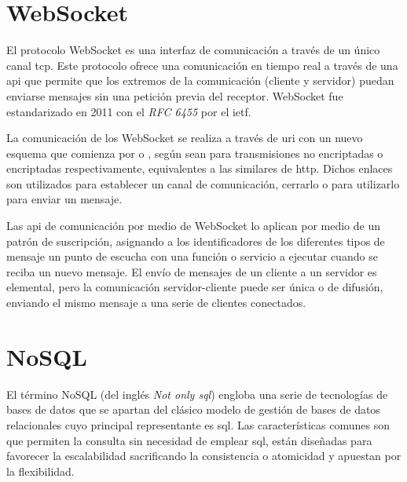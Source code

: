 \section{WebSocket}

El protocolo WebSocket es una interfaz de comunicación a través de un único canal \acrshort{tcp}. Este protocolo ofrece una comunicación en tiempo real a través de una \acrshort{api} que permite que los extremos de la comunicación (cliente y servidor) puedan enviarse mensajes sin una petición previa del receptor. WebSocket fue estandarizado en 2011 con el \emph{RFC 6455}\cite{rfc6455} por el \acrshort{ietf}.

La comunicación de los WebSocket se realiza a través de \Gls{uri} con un nuevo esquema que comienza por  o , según sean para transmisiones no encriptadas o encriptadas respectivamente, equivalentes a las similares de \acrshort{http}. Dichos enlaces son utilizados para establecer un canal de comunicación, cerrarlo o para utilizarlo para enviar un mensaje.

Las \acrshort{api} de comunicación por medio de WebSocket lo aplican por medio de un patrón de suscripción, asignando a los identificadores de los diferentes tipos de mensaje un punto de escucha con una función o servicio a ejecutar cuando se reciba un nuevo mensaje. El envío de mensajes de un cliente a un servidor es elemental, pero la comunicación servidor-cliente puede ser única o de difusión, enviando el mismo mensaje a una serie de clientes conectados.

\section{NoSQL}

El término NoSQL (del inglés \emph{Not only \acrshort{sql}}) engloba una serie de tecnologías de bases de datos que se apartan del clásico modelo de gestión de bases de datos relacionales cuyo principal representante es \acrshort{sql}. Las características comunes son que permiten la consulta sin necesidad de emplear \acrshort{sql}, están diseñadas para favorecer la escalabilidad sacrificando la consistencia o atomicidad y apuestan por la flexibilidad.

